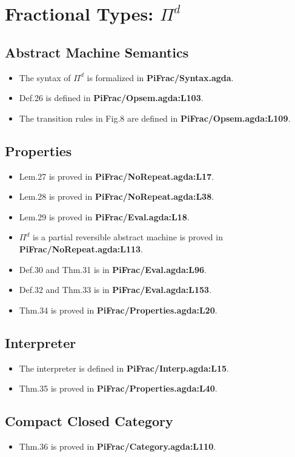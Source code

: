 \documentclass{article}
\begin{document}
\section{Fractional Types: $\Pi^d$}
\subsection{Abstract Machine Semantics}
\begin{itemize}
\item The syntax of $\Pi^d$ is formalized in \textbf{PiFrac/Syntax.agda}.
\item Def.26 is defined in \textbf{PiFrac/Opsem.agda:L103}.
\item The transition rules in Fig.8 are defined in \textbf{PiFrac/Opsem.agda:L109}.
\end{itemize}

\subsection{Properties}
\begin{itemize}
\item Lem.27 is proved in \textbf{PiFrac/NoRepeat.agda:L17}.
\item Lem.28 is proved in \textbf{PiFrac/NoRepeat.agda:L38}.
\item Lem.29 is proved in \textbf{PiFrac/Eval.agda:L18}.
\item $\Pi^d$ is a partial reversible abstract machine is proved in \textbf{PiFrac/NoRepeat.agda:L113}.
\item Def.30 and Thm.31 is in \textbf{PiFrac/Eval.agda:L96}.
\item Def.32 and Thm.33 is in \textbf{PiFrac/Eval.agda:L153}.
\item Thm.34 is proved in \textbf{PiFrac/Properties.agda:L20}.
\end{itemize}

\subsection{Interpreter}
\begin{itemize}
\item The interpreter is defined in \textbf{PiFrac/Interp.agda:L15}.
\item Thm.35 is proved in \textbf{PiFrac/Properties.agda:L40}.
\end{itemize}

\subsection{Compact Closed Category}
\begin{itemize}
\item Thm.36 is proved in \textbf{PiFrac/Category.agda:L110}.
\end{itemize}
\end{document}
